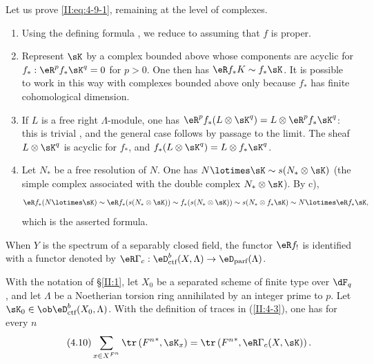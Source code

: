 Let us prove \eqref{II:eq:4-9-1}, remaining at the level of complexes.
\begin{enumerate}[\indent a)]
  \item Using the defining formula , we reduce to
    assuming that $f$ is proper.
  \item {}Represent $\sK$ by a complex bounded above whose components are
    acyclic for $f_*:\eR^p f_* \sK^q = 0$ for $p>0$. One then has
    $\eR f_* K \sim f_* \sK$. It is possible to work in this way with
    complexes bounded above only because $f_*$ has finite cohomological
    dimension.
  \item If $L$ is a free right $\Lambda$-module, one has
    $\eR^p f_*(L\otimes \sK^q) = L\otimes \eR^p f_* \sK^q$: this is trivial
    , and the general case follows by
    passage to the limit. The sheaf $L\otimes \sK^q$ is acyclic for $f_*$,
    and $f_*(L\otimes \sK^q) = L\otimes f_* \sK^q$.
  \item Let $N_*$ be a free resolution of $N$. One has
    $N\lotimes \sK\sim s(N_*\otimes \sK)$ (the simple complex
    associated with the double complex $N_*\otimes \sK$). By c),
    \[
      \eR f_*(N\lotimes \sK) \sim \eR f_* (s(N_*\otimes \sK)) \sim f_*(s(N_*\otimes \sK)) \sim s(N_*\otimes f_* \sK) \sim N\lotimes \eR f_* \sK \text{,}
    \]
    which is the asserted formula.
\end{enumerate}

When $Y$ is the spectrum of a separably closed field, the functor $\eR f_!$
is identified with a functor denoted by
$\eR \Gamma_c : \eD_\text{ctf}^b(X,\Lambda)\to\eD_\text{parf}(\Lambda)$.






\begin{theorem_}\label{II:4-10}
With the notation of \S\ref{II:1}, let $X_0$ be a separated scheme of finite
type over $\dF_q$, and let $\Lambda$ be a Noetherian torsion ring annihilated
by an integer prime to $p$. Let
$\sK_0\in\ob\eD_\textnormal{ctf}^b(X_0,\Lambda)$. With the definition of
traces in (\ref{II:4-3}), one has for every $n$
\begin{equation*}\tag{4.10}\label{II:eq:4-10}
  \sum_{x\in X^{F^n}} \tr\left({F^n}^*,\sK_x\right) = \tr\left({F^n}^*,\eR\Gamma_c(X,\sK)\right) \text{.}
\end{equation*}
\end{theorem_}

